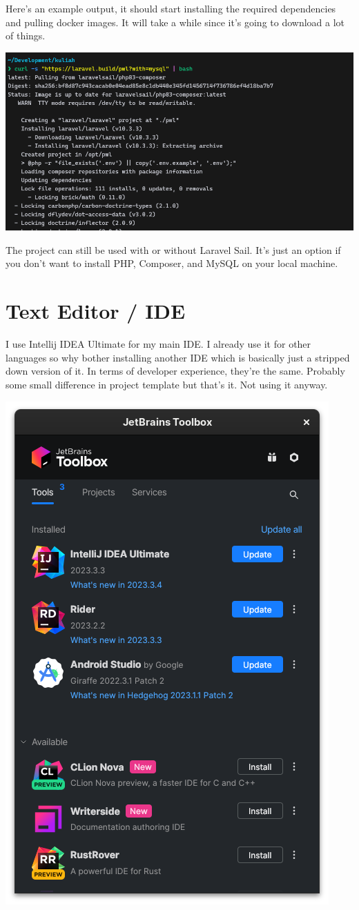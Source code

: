 \documentclass[12pt,titlepage]{article}
\begin{document}
Here's an example output, it should start installing the required 
dependencies and pulling docker images. It will take a while
since it's going to download a lot of things.

\begin{center}
    \includegraphics[width=.8\textwidth]{./images/sail-installation.png}
\end{center}

The project can still be used with or without Laravel Sail. It's just an option
if you don't want to install PHP, Composer, and MySQL on your local machine.

\pagebreak

\section{Text Editor / IDE}
I use Intellij IDEA Ultimate for my main IDE. I already use it for other languages
so why bother installing another IDE which is basically just a stripped down
version of it. In terms of developer experience, they're the same. Probably some
small difference in project template but that's it. Not using it anyway.

\vspace*{5mm}

\includegraphics[width=.4\textwidth]{./images/jetbrains-toolbox.png}
\end{document}
